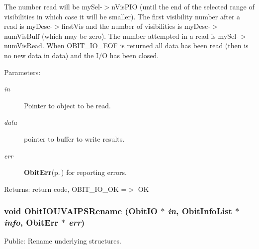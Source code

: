 The number read will be my\-Sel-$>$n\-Vis\-PIO (until the end of the selected range of visibilities in which case it will be smaller). The first visibility number after a read is my\-Desc-$>$first\-Vis and the number of visibilities is my\-Desc-$>$num\-Vis\-Buff (which may be zero). The number attempted in a read is my\-Sel-$>$num\-Vis\-Read. When OBIT\_\-IO\_\-EOF is returned all data has been read (then is no new data in data) and the I/O has been closed. \begin{Desc}
\item[Parameters:]
\begin{description}
\item[{\em in}]Pointer to object to be read. \item[{\em data}]pointer to buffer to write results. \item[{\em err}]{\bf Obit\-Err}{\rm (p.\,\pageref{structObitErr})} for reporting errors. \end{description}
\end{Desc}
\begin{Desc}
\item[Returns:]return code, OBIT\_\-IO\_\-OK =$>$ OK \end{Desc}
\subsubsection{\setlength{\rightskip}{0pt plus 5cm}void Obit\-IOUVAIPSRename ({\bf Obit\-IO} $\ast$ {\em in}, {\bf Obit\-Info\-List} $\ast$ {\em info}, {\bf Obit\-Err} $\ast$ {\em err})}\label{ObitIOUVAIPS_8c_a13}


Public: Rename underlying structures. 


